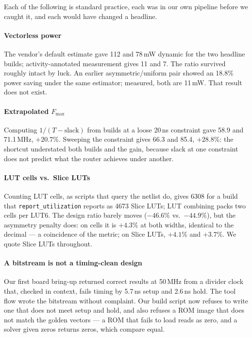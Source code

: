 \documentclass[conference]{IEEEtran}
\begin{document}
Each of the following is standard practice, each was in our own pipeline
before we caught it, and each would have changed a headline.

\paragraph{Vectorless power} The vendor's default estimate gave 112 and 78\,mW
dynamic for the two headline builds; activity-annotated measurement gives 11
and 7. The ratio survived roughly intact by luck. An earlier asymmetric/uniform
pair showed an 18.8\% power saving under the same estimator; measured, both are
11\,mW. That result does not exist.

\paragraph{Extrapolated $F_{\max}$} Computing $1/(T-\text{slack})$ from
builds at a loose 20\,ns constraint gave 58.9 and 71.1\,MHz, $+20.7\%$.
Sweeping the constraint gives 66.3 and 85.4, $+28.8\%$: the shortcut
understated both builds and the gain, because slack at one constraint does not
predict what the router achieves under another.

\paragraph{LUT cells vs.\ Slice LUTs} Counting LUT cells, as scripts that
query the netlist do, gives 6308 for a build that \texttt{report\_utilization}
reports as 4673 Slice LUTs; LUT combining packs two cells per LUT6. The design
ratio barely moves ($-46.6\%$ vs.\ $-44.9\%$), but the asymmetry penalty does:
on cells it is $+4.3\%$ at both widths, identical to the decimal --- a
coincidence of the metric; on Slice LUTs, $+4.1\%$ and $+3.7\%$. We quote Slice LUTs
throughout.

\paragraph{A bitstream is not a timing-clean design} Our first board bring-up
returned correct results at 50\,MHz from a divider clock that, checked in
context, fails timing by 5.7\,ns setup and 2.6\,ns hold. The tool flow wrote
the bitstream without complaint. Our build script now refuses to write one
that does not meet setup and hold, and also refuses a ROM image that does not
match the golden vectors --- a ROM that fails to load reads as zero, and a
solver given zeros returns zeros, which compare equal.
\end{document}
